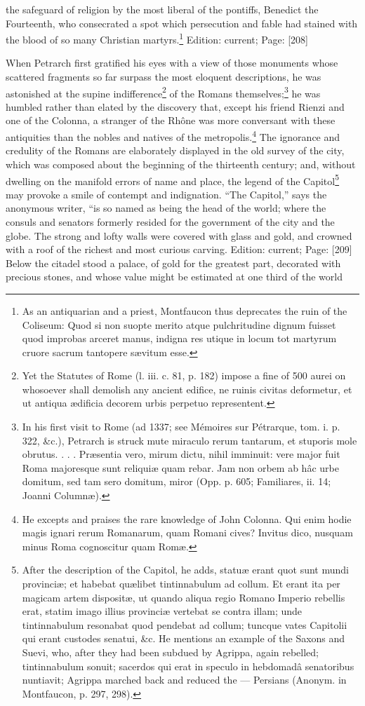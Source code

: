 the safeguard of religion by the most liberal of the pontiffs, Benedict the Fourteenth, who consecrated a spot which persecution and fable had stained with the blood of so many Christian martyrs.\footnote{As an antiquarian and a priest, Montfaucon thus deprecates the ruin of the Coliseum: Quod si non suopte merito atque pulchritudine dignum fuisset quod improbas arceret manus, indigna res utique in locum tot martyrum cruore sacrum tantopere sævitum esse.}
Edition: current; Page: [208]

When Petrarch first gratified his eyes with a view of those monuments whose scattered fragments so far surpass the most eloquent descriptions, he was astonished at the supine indifference\footnote{Yet the Statutes of Rome (l. iii. c. 81, p. 182) impose a fine of 500 aurei on whosoever shall demolish any ancient edifice, ne ruinis civitas deformetur, et ut antiqua ædificia decorem urbis perpetuo representent.} of the Romans themselves;\footnote{In his first visit to Rome (ad 1337; see Mémoires sur Pétrarque, tom. i. p. 322, \&c.), Petrarch is struck mute miraculo rerum tantarum, et stuporis mole obrutus. . . . Præsentia vero, mirum dictu, nihil imminuit: vere major fuit Roma majoresque sunt reliquiæ quam rebar. Jam non orbem ab hâc urbe domitum, sed tam sero domitum, miror (Opp. p. 605; Familiares, ii. 14; Joanni Columnæ).} he was humbled rather than elated by the discovery that, except his friend Rienzi and one of the Colonna, a stranger of the Rhône was more conversant with these antiquities than the nobles and natives of the metropolis.\footnote{He excepts and praises the rare knowledge of John Colonna. Qui enim hodie magis ignari rerum Romanarum, quam Romani cives? Invitus dico, nusquam minus Roma cognoscitur quam Romæ.} The ignorance and credulity of the Romans are elaborately displayed in the old survey of the city, which was composed about the beginning of the thirteenth century; and, without dwelling on the manifold errors of name and place, the legend of the Capitol\footnote{After the description of the Capitol, he adds, statuæ erant quot sunt mundi provinciæ; et habebat quælibet tintinnabulum ad collum. Et erant ita per magicam artem dispositæ, ut quando aliqua regio Romano Imperio rebellis erat, statim imago illius provinciæ vertebat se contra illam; unde tintinnabulum resonabat quod pendebat ad collum; tuncque vates Capitolii qui erant custodes senatui, \&c. He mentions an example of the Saxons and Suevi, who, after they had been subdued by Agrippa, again rebelled; tintinnabulum sonuit; sacerdos qui erat in speculo in hebdomadâ senatoribus nuntiavit; Agrippa marched back and reduced the \texthebrew{—} Persians (Anonym. in Montfaucon, p. 297, 298).} may provoke a smile of contempt and indignation. \texthebrew{“}The Capitol,\texthebrew{}” says the anonymous writer, \texthebrew{“}is so named as being the head of the world; where the consuls and senators formerly resided for the government of the city and the globe. The strong and lofty walls were covered with glass and gold, and crowned with a roof of the richest and most curious carving. Edition: current; Page: [209] Below the citadel stood a palace, of gold for the greatest part, decorated with precious stones, and whose value might be estimated at one third of the world 